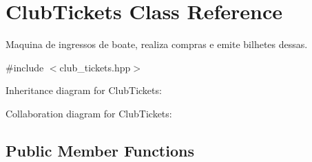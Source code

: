\hypertarget{class_club_tickets}{}\section{Club\+Tickets Class Reference}
\label{class_club_tickets}


Maquina de ingressos de boate, realiza compras e emite bilhetes dessas.  




{\ttfamily \#include $<$club\+\_\+tickets.\+hpp$>$}



Inheritance diagram for Club\+Tickets\+:


Collaboration diagram for Club\+Tickets\+:
\subsection*{Public Member Functions}
